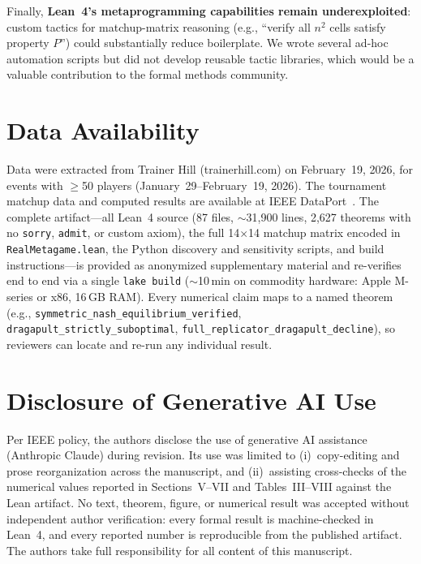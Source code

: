 \documentclass[journal]{IEEEtran}
\newif\ifhighlightchanges
\newcommand{\revised}[1]{\ifhighlightchanges\textcolor{blue!70!black}{#1}\else#1\fi}
\let\origsection\section
\renewcommand{\section}{\needspace{4\baselineskip}\origsection}
\begin{document}
Finally, \textbf{Lean~4's metaprogramming capabilities remain underexploited}: custom tactics for matchup-matrix reasoning (e.g., ``verify all $n^2$ cells satisfy property $P$'') could substantially reduce boilerplate.
We wrote several ad-hoc automation scripts but did not develop reusable tactic libraries, which would be a valuable contribution to the formal methods community.

\section*{Data Availability}
Data were extracted from Trainer Hill (trainerhill.com) on February~19, 2026, for events with $\geq$50 players (January~29--February~19, 2026).
The tournament matchup data and computed results are available at IEEE DataPort~\cite{ramos2026pokemondata}.
\revised{The complete artifact---all Lean~4 source (87 files, ${\sim}$31{,}900 lines, 2{,}627 theorems with no \texttt{sorry}, \texttt{admit}, or custom axiom), the full 14$\times$14 matchup matrix encoded in \texttt{RealMetagame.lean}, the Python discovery and sensitivity scripts, and build instructions---is provided as anonymized supplementary material and re-verifies end to end via a single \texttt{lake build} (${\sim}$10\,min on commodity hardware: Apple M-series or x86, 16\,GB RAM).
Every numerical claim maps to a named theorem (e.g., \texttt{symmetric\_nash\_equilibrium\_verified}, \texttt{dragapult\_strictly\_suboptimal}, \texttt{full\_replicator\_dragapult\_decline}), so reviewers can locate and re-run any individual result.}

\revised{\section*{Disclosure of Generative AI Use}
Per IEEE policy, the authors disclose the use of generative AI assistance (Anthropic Claude) during revision. Its use was limited to (i)~copy-editing and prose reorganization across the manuscript, and (ii)~assisting cross-checks of the numerical values reported in Sections~V--VII and Tables~III--VIII against the Lean artifact. No text, theorem, figure, or numerical result was accepted without independent author verification: every formal result is machine-checked in Lean~4, and every reported number is reproducible from the published artifact. The authors take full responsibility for all content of this manuscript.}



\end{document}
